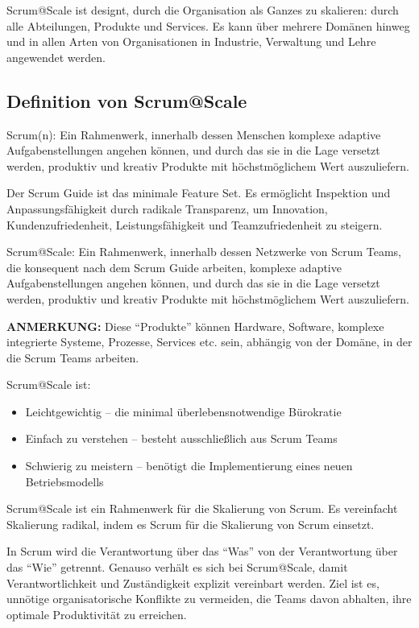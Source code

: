\documentclass[12pt,a4paper,parskip=full]{scrartcl}
\begin{document}
Scrum@Scale ist designt, durch die Organisation als Ganzes zu skalieren: durch
alle Abteilungen, Produkte und Services. Es kann über mehrere Domänen hinweg
und in allen Arten von Organisationen in Industrie, Verwaltung und Lehre
angewendet werden.

\subsection{Definition von Scrum@Scale}
Scrum(n): Ein Rahmenwerk, innerhalb dessen Menschen komplexe adaptive
Aufgabenstellungen angehen können, und durch das sie in die Lage versetzt
werden, produktiv und kreativ Produkte mit höchstmöglichem Wert auszuliefern.

Der Scrum Guide ist das minimale Feature Set. Es ermöglicht Inspektion und
Anpassungsfähigkeit durch radikale Transparenz, um Innovation,
Kundenzufriedenheit, Leistungsfähigkeit und Teamzufriedenheit zu steigern.

Scrum@Scale: Ein Rahmenwerk, innerhalb dessen Netzwerke von Scrum Teams, die
konsequent nach dem Scrum Guide arbeiten, komplexe adaptive Aufgabenstellungen
angehen können, und durch das sie in die Lage versetzt werden, produktiv und
kreativ Produkte mit höchstmöglichem Wert auszuliefern.

\textbf{ANMERKUNG:} Diese ``Produkte'' können Hardware, Software, komplexe
integrierte Systeme, Prozesse, Services etc. sein, abhängig von der Domäne,
in der die Scrum Teams arbeiten.

Scrum@Scale ist:
\begin{itemize}
\item Leichtgewichtig – die minimal überlebensnotwendige Bürokratie
\item Einfach zu verstehen – besteht ausschließlich aus Scrum Teams
\item Schwierig zu meistern – benötigt die Implementierung eines neuen Betriebsmodells
\end{itemize}


Scrum@Scale ist ein Rahmenwerk für die Skalierung von Scrum. Es vereinfacht Skalierung radikal, indem es Scrum für die Skalierung von Scrum einsetzt.

In Scrum wird die Verantwortung über das ``Was'' von der Verantwortung über das
``Wie'' getrennt. Genauso verhält es sich bei Scrum@Scale, damit
Verantwortlichkeit und Zuständigkeit explizit vereinbart werden. Ziel ist es,
unnötige organisatorische Konflikte zu vermeiden, die Teams davon abhalten,
ihre optimale Produktivität zu erreichen.
\end{document}

